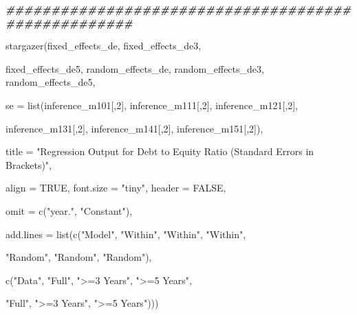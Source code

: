 \documentclass[a4paper,nobind]{templates/ociamthesis}
\newenvironment{Shaded}{\begin{snugshade}}{\end{snugshade}}
\newcommand{\AttributeTok}[1]{\textcolor[rgb]{0.77,0.63,0.00}{#1}}
\newcommand{\ConstantTok}[1]{\textcolor[rgb]{0.00,0.00,0.00}{#1}}
\newcommand{\DecValTok}[1]{\textcolor[rgb]{0.00,0.00,0.81}{#1}}
\newcommand{\DocumentationTok}[1]{\textcolor[rgb]{0.56,0.35,0.01}{\textbf{\textit{#1}}}}
\newcommand{\FunctionTok}[1]{\textcolor[rgb]{0.00,0.00,0.00}{#1}}
\newcommand{\NormalTok}[1]{#1}
\newcommand{\StringTok}[1]{\textcolor[rgb]{0.31,0.60,0.02}{#1}}
\renewenvironment{Shaded}
{
  \vspace{10pt}%
  \begin{snugshade}%
}{%
  \end{snugshade}%
  \vspace{8pt}%
}
\begin{document}
\begin{landscape}
\begin{Shaded}
\begin{Highlighting}[]
\DocumentationTok{\#\#\#\#\#\#\#\#\#\#\#\#\#\#\#\#\#\#\#\#\#\#\#\#\#\#\#\#\#\#\#\#\#\#\#\#\#\#\#\#\#\#\#\#\#\#\#\#\#\#\#\#}

\FunctionTok{stargazer}\NormalTok{(fixed\_effects\_de, fixed\_effects\_de3, }
          
\NormalTok{          fixed\_effects\_de5, random\_effects\_de, random\_effects\_de3, random\_effects\_de5,}
          
          \AttributeTok{se =} \FunctionTok{list}\NormalTok{(inference\_m101[,}\DecValTok{2}\NormalTok{], inference\_m111[,}\DecValTok{2}\NormalTok{], inference\_m121[,}\DecValTok{2}\NormalTok{], }
          
\NormalTok{          inference\_m131[,}\DecValTok{2}\NormalTok{], inference\_m141[,}\DecValTok{2}\NormalTok{], inference\_m151[,}\DecValTok{2}\NormalTok{]),}
          
          \AttributeTok{title =} \StringTok{"Regression Output for Debt to Equity Ratio (Standard Errors in Brackets)"}\NormalTok{, }
          
          \AttributeTok{align =} \ConstantTok{TRUE}\NormalTok{, }\AttributeTok{font.size =} \StringTok{"tiny"}\NormalTok{, }\AttributeTok{header =} \ConstantTok{FALSE}\NormalTok{, }
          
          \AttributeTok{omit =} \FunctionTok{c}\NormalTok{(}\StringTok{"year."}\NormalTok{, }\StringTok{"Constant"}\NormalTok{),}
          
          \AttributeTok{add.lines =} \FunctionTok{list}\NormalTok{(}\FunctionTok{c}\NormalTok{(}\StringTok{"Model"}\NormalTok{, }\StringTok{"Within"}\NormalTok{, }\StringTok{"Within"}\NormalTok{, }\StringTok{"Within"}\NormalTok{, }
                        
                        \StringTok{"Random"}\NormalTok{, }\StringTok{"Random"}\NormalTok{, }\StringTok{"Random"}\NormalTok{), }
          
          \FunctionTok{c}\NormalTok{(}\StringTok{"Data"}\NormalTok{, }\StringTok{"Full"}\NormalTok{, }\StringTok{"\textgreater{}=3 Years"}\NormalTok{, }\StringTok{"\textgreater{}=5 Years"}\NormalTok{, }
            
            \StringTok{"Full"}\NormalTok{, }\StringTok{"\textgreater{}=3 Years"}\NormalTok{, }\StringTok{"\textgreater{}=5 Years"}\NormalTok{)))}
\end{Highlighting}
\end{Shaded}


\end{landscape}
\end{document}
